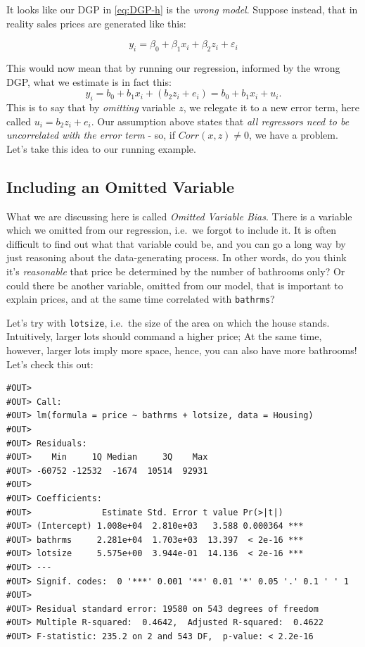 \documentclass[]{book}
\begin{document}
 It looks like our DGP in \eqref{eq:DGP-h} is the \emph{wrong model}.
Suppose instead, that in reality sales prices are generated like this:

\begin{equation}
y_i = \beta_0 + \beta_1 x_i + \beta_2 z_i + \varepsilon_i \label{eq:DGP-h2}
\end{equation}

This would now mean that by running our regression, informed by the
wrong DGP, what we estimate is in fact this: \[
y_i = b_0 + b_1 x_i + (b_2 z_i + e_i)  = b_0 + b_1 x_i + u_i.
\] This is to say that by \emph{omitting} variable \(z\), we relegate it
to a new error term, here called \(u_i = b_2 z_i + e_i\). Our assumption
above states that \emph{all regressors need to be uncorrelated with the
error term} - so, if \(Corr(x,z)\neq 0\), we have a problem. Let's take
this idea to our running example.

\subsection{Including an Omitted
Variable}\label{including-an-omitted-variable}

What we are discussing here is called \emph{Omitted Variable Bias}.
There is a variable which we omitted from our regression, i.e.~we forgot
to include it. It is often difficult to find out what that variable
could be, and you can go a long way by just reasoning about the
data-generating process. In other words, do you think it's
\emph{reasonable} that price be determined by the number of bathrooms
only? Or could there be another variable, omitted from our model, that
is important to explain prices, and at the same time correlated with
\texttt{bathrms}?

Let's try with \texttt{lotsize}, i.e.~the size of the area on which the
house stands. Intuitively, larger lots should command a higher price; At
the same time, however, larger lots imply more space, hence, you can
also have more bathrooms! Let's check this out:

\begin{verbatim}
#OUT> 
#OUT> Call:
#OUT> lm(formula = price ~ bathrms + lotsize, data = Housing)
#OUT> 
#OUT> Residuals:
#OUT>    Min     1Q Median     3Q    Max 
#OUT> -60752 -12532  -1674  10514  92931 
#OUT> 
#OUT> Coefficients:
#OUT>              Estimate Std. Error t value Pr(>|t|)    
#OUT> (Intercept) 1.008e+04  2.810e+03   3.588 0.000364 ***
#OUT> bathrms     2.281e+04  1.703e+03  13.397  < 2e-16 ***
#OUT> lotsize     5.575e+00  3.944e-01  14.136  < 2e-16 ***
#OUT> ---
#OUT> Signif. codes:  0 '***' 0.001 '**' 0.01 '*' 0.05 '.' 0.1 ' ' 1
#OUT> 
#OUT> Residual standard error: 19580 on 543 degrees of freedom
#OUT> Multiple R-squared:  0.4642,  Adjusted R-squared:  0.4622 
#OUT> F-statistic: 235.2 on 2 and 543 DF,  p-value: < 2.2e-16
\end{verbatim}
\end{document}
